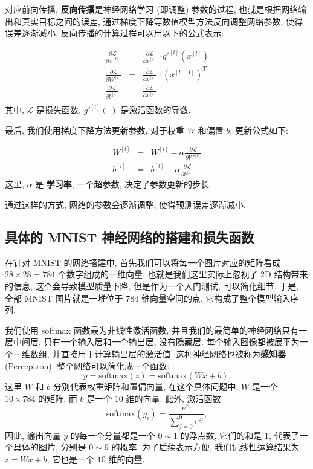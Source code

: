 \documentclass{ctexart}
\begin{document}
对应前向传播, {\bfseries 反向传播}是神经网络学习 (即调整) 参数的过程, 也就是根据网络输出和真实目标之间的误差,
通过梯度下降等数值模型方法反向调整网络参数, 使得误差逐渐减小\cite{rumelhart1986learning}. 反向传播的计算过程可以用以下的公式表示:

\begin{eqnarray}
    \frac{\partial \mathcal{L}}{\partial x^{[l]}} &=& \frac{\partial \mathcal{L}}{\partial x^{[l]}} \cdot g'^{[l]}(x^{[l]}) \\
    \frac{\partial \mathcal{L}}{\partial W^{[l]}} &=& \frac{\partial \mathcal{L}}{\partial x^{[l]}} \cdot (x^{[l-1]})^T \\
    \frac{\partial \mathcal{L}}{\partial b^{[l]}} &=& \frac{\partial \mathcal{L}}{\partial x^{[l]}} \\
\end{eqnarray}
其中, $\mathcal{L}$ 是损失函数, $g'^{[l]}(\cdot)$ 是激活函数的导数.

最后, 我们使用梯度下降方法更新参数, 对于权重 $W$ 和偏置 $b$, 更新公式如下:

\begin{eqnarray}
    W^{[l]} &=& W^{[l]} - \alpha \frac{\partial \mathcal{L}}{\partial W^{[l]}} \\
    b^{[l]} &=& b^{[l]} - \alpha \frac{\partial \mathcal{L}}{\partial b^{[l]}}
\end{eqnarray}
这里, $\alpha$ 是 {\bfseries 学习率}, 一个超参数, 决定了参数更新的步长.

通过这样的方式, 网络的参数会逐渐调整, 使得预测误差逐渐减小.

\subsection{具体的 MNIST 神经网络的搭建和损失函数}

在针对 MNIST 的网络搭建中, 首先我们可以将每一个图片对应的矩阵看成 $28 \times 28 = 784$ 个数字组成的一维向量.
也就是我们这里实际上忽视了 2D 结构带来的信息, 这个会导致模型质量下降, 但是作为一个入门测试, 可以简化细节.
于是, 全部 MNIST 图片就是一堆位于 $784$ 维向量空间的点, 它构成了整个模型输入序列.

我们使用 softmax 函数最为非线性激活函数, 并且我们的最简单的神经网络只有一层中间层,
只有一个输入层和一个输出层, 没有隐藏层. 每个输入图像都被展平为一个一维数组, 并直接用于计算输出层的激活值.
这种神经网络也被称为{\bfseries 感知器} (Perceptron). 整个网络可以简化成一个函数:
\begin{equation}
    y = \mbox{softmax}(z) = \mbox{softmax}(W x + b).
\end{equation}
这里 $W$ 和 $b$ 分别代表权重矩阵和置偏向量, 在这个具体问题中, $W$ 是一个 $10 \times 784$ 的矩阵, 而 $b$ 是一个 $10$ 维的向量.
此外, 激活函数
\begin{equation}
    \mbox{softmax}(y_i) = \frac{e^{z_i}}{\sum_{j = 0}^{9}e^{z_j}},
\end{equation}
因此, 输出向量 $y$ 的每一个分量都是一个 $0 \sim 1$ 的浮点数, 它们的和是 $1$, 代表了一个具体的图片, 分别是 $0 \sim 9$ 的概率.
为了后续表示方便, 我们记线性运算结果为 $z = W x + b$, 它也是一个 $10$ 维的向量.
\end{document}
